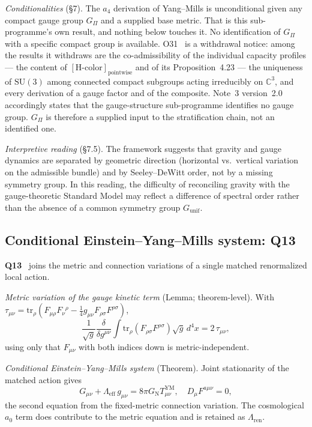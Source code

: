 \documentclass[11pt,a4paper]{article}
\theoremstyle{definition}
\newcommand{\SU}{\mathrm{SU}}
\newcommand{\GN}{G_{\mathrm{N}}}
\newcommand{\Gpi}{G_\Pi}
\begin{document}
      \textit{Conditionalities} (§7).
      The $a_4$ derivation of Yang--Mills is unconditional given any compact gauge group $\Gpi$ and a supplied
      base metric.
      That is this sub-programme's own result, and nothing below touches it.
      No identification of $\Gpi$ with a specific compact group is available.
      O31~\cite{Beau2026a35} is a withdrawal notice: among the results it withdraws are the
      co-admissibility of the individual capacity profiles --- the content of
      $[\mathrm{H\text{-}color}]_{\mathrm{pointwise}}$ and of its Proposition~4.23 --- the
      uniqueness of $\SU(3)$ among connected compact subgroups acting irreducibly on
      $\mathbb{C}^3$, and every derivation of a gauge factor and of the composite.
      Note~3 version~2.0~\cite{Beau2026gsnote} accordingly states that the gauge-structure
      sub-programme identifies no gauge group.
      $\Gpi$ is therefore a supplied input to the stratification chain, not an identified one.

      \textit{Interpretive reading} (§7.5).
      The framework suggests that gravity and gauge dynamics are separated by geometric direction (horizontal vs.\
      vertical variation on the admissible bundle) and by Seeley--DeWitt order, not by a missing symmetry group.
      In this reading, the difficulty of reconciling gravity with the gauge-theoretic Standard Model may reflect
      a difference of spectral order rather than the absence of a common symmetry group
      $G_{\mathrm{unif}}$.

    \subsection{Conditional Einstein--Yang--Mills system: Q13}
      \label{sec:q13}

      \textbf{Q13}~\cite{Beau2026q13} joins the metric and connection variations of a single
      matched renormalized local action.

      \textit{Metric variation of the gauge kinetic term} (Lemma; theorem-level).
      With $\tau_{\mu\nu} = \mathrm{tr}_\rho(F_{\mu\rho}F_\nu{}^\rho
      - \tfrac14 g_{\mu\nu}F_{\rho\sigma}F^{\rho\sigma})$,
      \[
        \frac{1}{\sqrt{g}}\frac{\delta}{\delta g^{\mu\nu}}
        \int \mathrm{tr}_\rho(F_{\rho\sigma}F^{\rho\sigma})\sqrt{g}\,d^4x = 2\,\tau_{\mu\nu},
      \]
      using only that $F_{\mu\nu}$ with both indices down is metric-independent.

      \textit{Conditional Einstein--Yang--Mills system} (Theorem).
      Joint stationarity of the matched action gives
      \[
        G_{\mu\nu} + \Lambda_{\mathrm{eff}}\,g_{\mu\nu} = 8\pi\GN T^{\mathrm{YM}}_{\mu\nu},
        \quad D_\mu F^{a\mu\nu} = 0,
      \]
      the second equation from the fixed-metric connection variation.
      The cosmological $a_0$ term does contribute to the metric equation and is retained as
      $\Lambda_{\mathrm{ren}}$.
\end{document}
